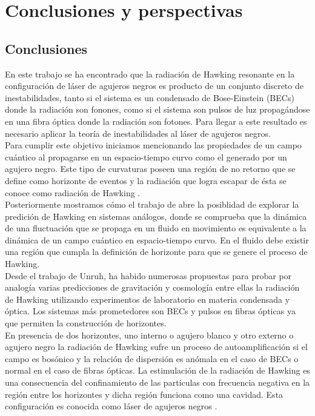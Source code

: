 \chapter{Conclusiones y perspectivas}\label{cap6}
\section{Conclusiones}

En este trabajo se ha encontrado que la radiaci\'{o}n de Hawking resonante en la configuraci\'{o}n de l\'{a}ser de agujeros negros es producto de un conjunto discreto de inestabilidades, tanto si el sistema es un condensado de Bose-Einstein (BECs) donde la radiaci\'{o}n son fonones, como si el sistema son pulsos de luz propag\'{a}ndose en una fibra \'{o}ptica donde la radiaci\'{o}n son fotones. Para llegar a este resultado es necesario aplicar la teor\'{i}a de inestabilidades al l\'{a}ser de agujeros negros.\\

Para cumplir este objetivo iniciamos mencionando las propiedades de un campo cu\'{a}ntico al  propagarse en un espacio-tiempo curvo como el generado por un agujero negro. Este tipo de curvaturas poseen una regi\'{o}n de no retorno que se define como horizonte de eventos y la radiaci\'{o}n que logra escapar de \'{e}sta se conoce como radiaci\'{o}n de Hawking \citep{Hawking1974}.\\

Posteriormente mostramos c\'{o}mo el trabajo de \cite{Unruh1981} abre la posiblidad de explorar la predici\'{o}n de Hawking en sistemas an\'{a}logos, donde se comprueba que la din\'{a}mica de una fluctuaci\'{o}n que se propaga en un fluido en movimiento es equivalente a la din\'{a}mica de un campo cu\'{a}ntico en espacio-tiempo curvo. En el fluido debe existir una regi\'{o}n que cumpla la definici\'{o}n de horizonte para que se genere el proceso de Hawking.\\

Desde el trabajo de Unruh, ha habido numerosas propuestas para probar por analog\'{i}a varias predicciones de gravitaci\'{o}n y cosmolog\'{i}a entre ellas la radiaci\'{o}n de Hawking utilizando experimentos de laboratorio en materia condensada y \'{o}ptica. Los sistemas m\'{a}s prometedores son BECs y pulsos en fibras \'{o}pticas ya que permiten la construcci\'{o}n de horizontes.\\

En presencia de dos horizontes, uno interno o agujero blanco y otro externo o agujero negro la radiaci\'{o}n de Hawking sufre un proceso de autoamplificaci\'{o}n si el campo es bos\'onico y la relaci\'{o}n de dispersi\'{o}n es an\'{o}mala en el caso de BECs o normal en el caso de fibras \'{o}pticas. La estimulaci\'{o}n de la radiaci\'{o}n de Hawking es una consecuencia del confinamiento de las part\'{i}culas con frecuencia negativa en la regi\'{o}n entre los horizontes y dicha regi\'{o}n funciona como una cavidad. Esta configuraci\'{o}n es conocida como l\'{a}ser de agujeros negros \citep{Corley1999}.\\

